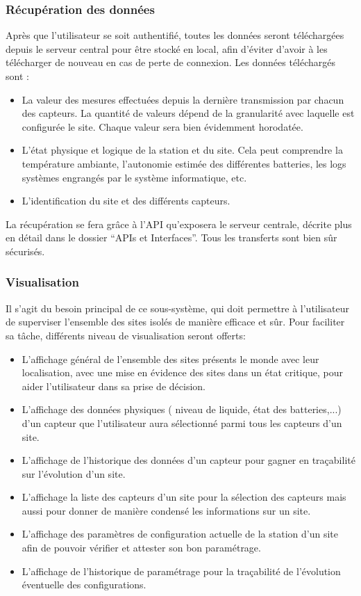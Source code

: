 \subsubsection{Récupération des données}
Après que l'utilisateur se soit authentifié, toutes les données seront téléchargées depuis le serveur central pour être stocké en local, afin d'éviter d'avoir à les télécharger de nouveau en cas de perte de connexion. Les données téléchargés sont :
\begin{itemize}
\item La valeur des mesures effectuées depuis la dernière transmission par chacun des capteurs. La quantité de valeurs dépend de la granularité avec laquelle est configurée le site. Chaque valeur sera bien évidemment horodatée.
\item L'état physique et logique de la station et du site. Cela peut comprendre la température ambiante, l'autonomie estimée des différentes batteries, les logs systèmes engrangés par le système informatique, etc.
\item L'identification du site et des différents capteurs. %
\end{itemize}
La récupération se fera grâce à l'API qu'exposera le serveur centrale, décrite plus en détail dans le dossier ``APIs et Interfaces''. Tous les transferts sont bien sûr sécurisés.

\subsubsection{Visualisation}
Il s'agit du besoin principal de ce sous-système, qui doit permettre à l'utilisateur de superviser l'ensemble des sites isolés de manière efficace et sûr. Pour faciliter sa tâche, différents niveau de visualisation seront offerts:
\begin{itemize}
	\item L'affichage général de l'ensemble des sites présents le monde avec leur localisation, avec une mise en évidence des sites dans un état critique, pour aider l'utilisateur dans sa prise de décision.
	\item L'affichage des données physiques ( niveau de liquide, état des batteries,...) d'un capteur que l'utilisateur aura sélectionné parmi tous les capteurs d'un site.
	\item L'affichage de l'historique des données d'un capteur pour gagner en traçabilité sur l'évolution d'un site.
	\item L'affichage la liste des capteurs d'un site pour la sélection des capteurs mais aussi pour donner de manière condensé les informations sur un site.
	\item L'affichage des paramètres de configuration actuelle de la station d'un site afin de pouvoir vérifier et attester son bon paramétrage.
	\item L'affichage de l'historique de paramétrage pour la traçabilité de l'évolution éventuelle des configurations.
\end{itemize}

